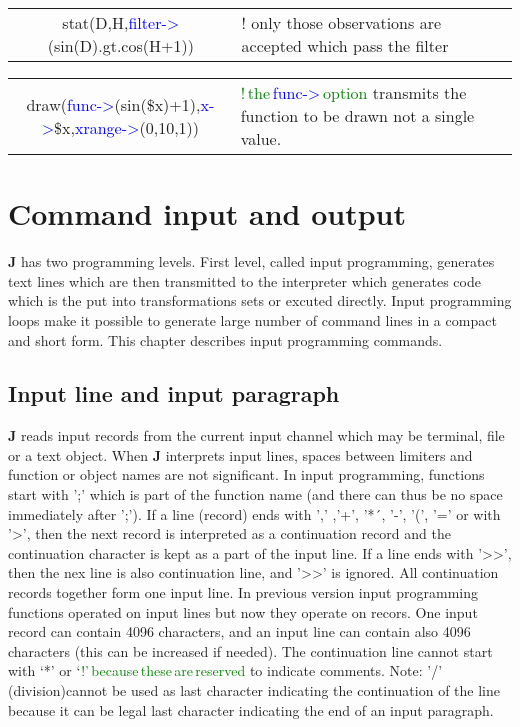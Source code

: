 \vspace{-1.51em}
\begin{table}[H]
\label{hopo4}
\begin{tabularx}{\textwidth}{ c  X }
 \textcolor{VioletRed}{stat}(D,H,\textcolor{blue}{filter->}(\textcolor{VioletRed}{sin}(D).gt.\textcolor{VioletRed}{cos}(H+1)) &!
 only those observations are
 accepted which pass the filter
\end{tabularx}
\end{table}
\vspace{-1.51em}
\begin{table}[H]
\label{hopo4}
\begin{tabularx}{\textwidth}{ c  X }
 \textcolor{VioletRed}{draw}(\textcolor{blue}{func->}(\textcolor{VioletRed}{sin}(\$x)+1),\textcolor{blue}{x->}\$x,\textcolor{blue}{xrange->}(0,10,1)) &\textcolor{green}{!\,the\,\textcolor{blue}{func->}\,option}
 transmits the function to be drawn not a single value.
\end{tabularx}
\end{table}
\section{Command input and output}
\label{cominout}
 \textbf{J} has two programming levels. First level, called input programming, generates text lines which are then
 transmitted to the interpreter which generates code which is the put into transformations sets or
excuted directly. Input programming loops make it possible to generate large number of command lines
 in a compact and short form. This chapter describes input programming commands.
\subsection{Input line and input paragraph}
\label{inpuline}
\textbf{J} reads input records from the current input channel which may be terminal, file or a text object.
 When \textbf{J} interprets input lines, spaces between limiters and function or object names are not
 significant. In input programming, functions start with ';' which is part of the function name (and
 there can thus be no space immediately after ';'). If a line (record) ends with ',' ,'+', '*´, '-',
 '(', '=' or with '>', then the next record is interpreted as a continuation record and
 the continuation character is kept as a part of the input
 line. If a line ends with '>>', then
 the nex line is also continuation line, and  '>>' is ignored. All continuation
 records together form one input line. In previous version input programming functions operated on input lines
 but now they operate on recors. One input record can contain 4096 characters, and an input line can contain also 4096 characters
 (this can be increased if needed).
 The continuation line cannot start with ‘*’ or ‘\textcolor{green}{!’\,because\,these\,are\,reserved}
 to indicate comments.  Note: '/' (division)cannot be used as last character indicating the continuation of the line because it can
 be legal last character indicating the end of an input paragraph.

